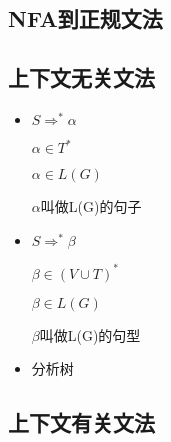 \documentclass[UTF8]{article}
\begin{document}
\subsection{NFA到正规文法}
\subsection{上下文无关文法}
\begin{itemize}
	\item $ S\Rightarrow^*\alpha $
	
	$\alpha\in T^*  $
	
	$\alpha\in L(G) $
	
	$\alpha$叫做L(G)的句子
	\item $ S\Rightarrow^*\beta $
	
	$\beta\in (V\cup T)^*  $
	
	$\beta\in L(G) $
	
	$\beta$叫做L(G)的句型
	\item 分析树
\end{itemize}

\subsection{上下文有关文法}
\end{document}
